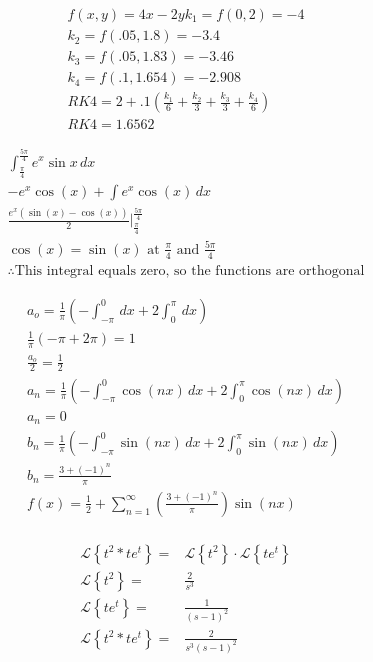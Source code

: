 \documentclass[12pt]{article}
\begin{document}
\begin{equation}
  \begin{split}
    f(x,y)=4x-2y
    k_1=f(0,2)=-4\\
    k_2=f(.05,1.8)=-3.4\\
    k_3=f(.05,1.83)=-3.46\\
    k_4=f(.1,1.654)=-2.908\\
        RK4=2+.1\left( \frac{k_1}{6}+\frac{k_2}{3}+\frac{k_3}{3}+\frac{k_4}{6} \right)\\
        RK4=1.6562
  \end{split}
  \label{8}
\end{equation}


\hline
\newpage
\hline
\begin{equation}
  \begin{split}
    \int_{\frac{\pi}{4}}^{\frac{5\pi}{4}}e^x\sin x \, dx\\
    -e^x\cos(x)+\int e^x\cos(x)\, dx \\
    \frac{e^x(\sin(x)-\cos(x))}{2}\Big|_{\frac{\pi}{4}}^{\frac{5\pi}{4}}\\
    \cos(x)=\sin(x) \text{ at } \frac{\pi}{4} \text{ and } \frac{5\pi}{4}\\
    \therefore \text{This integral equals zero, so the functions are orthogonal}
  \end{split}
  \label{9}
\end{equation}

\hline
\begin{equation}
  \begin{split}
    a_o=\frac{1}{\pi}\left(-\int_{-\pi}^0\,dx+2\int_0^{\pi}\,dx\right)\\
    \frac{1}{\pi}\left( -\pi+2\pi \right)=1\\
    \frac{a_o}{2}=\frac{1}{2}\\
    a_n=\frac{1}{\pi}\left(-\int_{-\pi}^0\cos(nx)\,dx+2\int_0^{\pi}\cos(nx)\,dx\right)\\
    a_n=0\\
    b_n=\frac{1}{\pi}\left(-\int_{-\pi}^0\sin(nx)\,dx+2\int_0^{\pi}\sin(nx)\,dx\right)\\
    b_n=\frac{3+(-1)^n}{\pi}\\
    f(x)=\frac{1}{2}+\sum_{n=1}^{\infty} \left( \frac{3+(-1)^n}{\pi} \right)\sin(nx)\\
  \end{split}
  \label{10}
\end{equation}
\hline

\begin{equation}
  \begin{split}
    \mathcal{L}\left\{ t^2\ast te^t \right\}=&\mathcal{L}\left\{ t^2 \right\}\cdot\mathcal{L}\left\{ te^t \right\}\\
    \mathcal{L}\left\{ t^2 \right\}=&\frac{2}{s^3}\\
    \mathcal{L}\left\{ te^t \right\}=&\frac{1}{(s-1)^2}\\
    \mathcal{L}\left\{ t^2\ast te^t \right\}=&\frac{2}{s^3(s-1)^2}
  \end{split}
  \label{11}
\end{equation}
\hline
\end{document}
